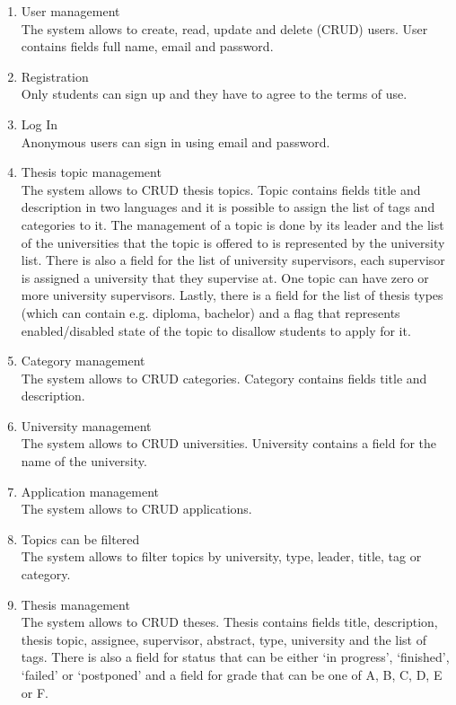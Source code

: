 \begin{enumerate}
    \item User management\\
    The system allows to create, read, update and delete (CRUD) users. User contains fields full name, email and password.

    \item Registration\\
    Only students can sign up and they have to agree to the terms of use.

    \item Log In\\
    Anonymous users can sign in using email and password.

    \item Thesis topic management\\
    The system allows to CRUD thesis topics. Topic contains fields title and description in two languages and it is possible to assign the list of tags and categories to it. The management of a topic is done by its leader and the list of the universities that the topic is offered to is represented by the university list. There is also a field for the list of university supervisors, each supervisor is assigned a university that they supervise at. One topic can have zero or more university supervisors. Lastly, there is a field for the list of thesis types (which can contain e.g. diploma, bachelor) and a flag that represents enabled/disabled state of the topic to disallow students to apply for it.

    \item Category management\\
    The system allows to CRUD categories. Category contains fields title and description.

    \item University management\\
    The system allows to CRUD universities. University contains a field for the name of the university.

    \item Application management\\
    The system allows to CRUD applications.

    \item Topics can be filtered\\
    The system allows to filter topics by university, type, leader, title, tag or category.

    \item Thesis management\\
    The system allows to CRUD theses. Thesis contains fields title, description, thesis topic, assignee, supervisor, abstract, type, university and the list of tags. There is also a field for status that can be either `in progress', `finished', `failed' or `postponed' and a field for grade that can be one of A, B, C, D, E or F.


\end{enumerate}
